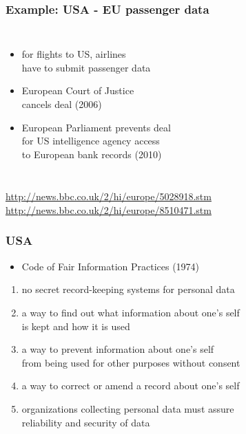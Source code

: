 \documentclass[dvipsnames]{beamer}
\theoremstyle{plain}
\begin{document}
\begin{frame}
  \frametitle{Example: USA - EU passenger data}

  \begin{columns}

    \begin{itemize}
      \item for flights to US, airlines\\
        have to submit passenger data
      \item European Court of Justice\\
        cancels deal (2006)

      \pause
      \medskip
      \item European Parliament prevents deal\\
        for US intelligence agency access\\
        to European bank records (2010)
    \end{itemize}
  \end{columns}

  \medskip
  \tiny{\url{http://news.bbc.co.uk/2/hi/europe/5028918.stm}}\\
  \smallskip
  \tiny{\url{http://news.bbc.co.uk/2/hi/europe/8510471.stm}}\\
\end{frame}

\begin{frame}
  \frametitle{USA}

  \begin{itemize}
   \item Code of Fair Information Practices (1974)
  \end{itemize}

  \begin{enumerate}
    \item no secret record-keeping systems for personal data
    \item a way to find out what information about one's self\\
      is kept and how it is used
    \item a way to prevent information about one's self\\
      from being used for other purposes without consent
    \item a way to correct or amend a record about one's self
    \item organizations collecting personal data must assure\\
      reliability and security of data
  \end{enumerate}
\end{frame}
\end{document}
